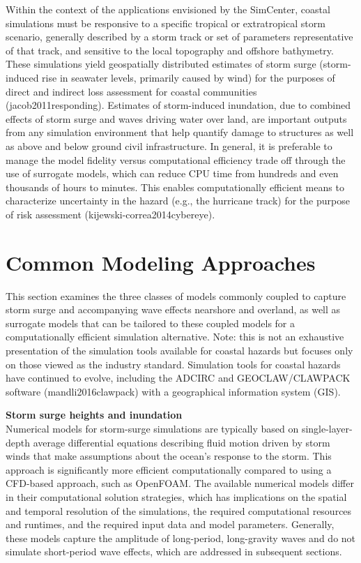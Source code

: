 Within the context of the applications envisioned by the SimCenter, coastal simulations must be responsive to a specific tropical or extratropical storm scenario, generally described by a storm track or set of parameters representative of that track, and sensitive to the local topography and offshore bathymetry. These simulations yield geospatially distributed estimates of storm surge (storm-induced rise in seawater levels, primarily caused by wind) for the purposes of direct and indirect loss assessment for coastal communities (jacob2011responding). Estimates of storm-induced inundation, due to combined effects of storm surge and waves driving water over land, are important outputs from any simulation environment that help quantify damage to structures as well as above and below ground civil infrastructure.
In general, it is preferable to manage the model fidelity versus computational efficiency trade off through the use of surrogate models, which can reduce CPU time from hundreds and even thousands of hours to minutes. This enables computationally efficient means to characterize uncertainty in the hazard (e.g., the hurricane track) for the purpose of risk assessment (kijewski-correa2014cybereye).

\section{Common Modeling Approaches}
\label{sec:storm_surge_methods}

This section examines the three classes of models commonly coupled to capture storm surge and accompanying wave effects nearshore and overland, as well as surrogate models that can be tailored to these coupled models for a computationally efficient simulation alternative. Note: this is not an exhaustive presentation of the simulation tools available for coastal hazards but focuses only on those viewed as the industry standard. Simulation tools for coastal hazards have continued to evolve, including the ADCIRC \citep{adcirc_web} and GEOCLAW/CLAWPACK software (mandli2016clawpack) with a geographical information system (GIS).
\newline

\noindent\textbf{Storm surge heights and inundation} \\Numerical models for storm-surge simulations are typically based on single-layer-depth average differential equations describing fluid motion driven by storm winds that make assumptions about the ocean’s response to the storm. This approach is significantly more efficient computationally compared to using a CFD-based approach, such as OpenFOAM. The available numerical models differ in their computational solution strategies, which has implications on the spatial and temporal resolution of the simulations, the required computational resources and runtimes, and the required input data and model parameters. Generally, these models capture the amplitude of long-period, long-gravity waves and do not simulate short-period wave effects, which are addressed in subsequent sections.

